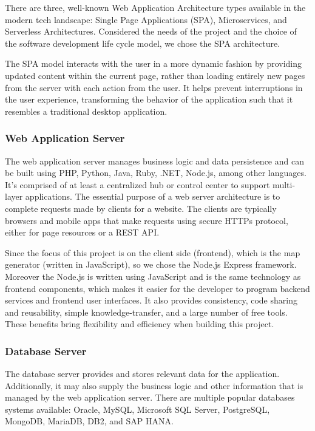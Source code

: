 There are three, well-known Web Application Architecture types available in the modern tech landscape: Single Page Applications (SPA), Microservices, and Serverless Architectures. Considered the needs of the project and the choice of the software development life cycle model, we chose the SPA architecture.

The SPA model interacts with the user in a more dynamic fashion by providing updated content within the current page, rather than loading entirely new pages from the server with each action from the user. It helps prevent interruptions in the user experience, transforming the behavior of the application such that it resembles a traditional desktop application.

\subsubsection{Web Application Server}
The web application server manages business logic and data persistence and can be built using PHP, Python, Java, Ruby, .NET, Node.js, among other languages. It’s comprised of at least a centralized hub or control center to support multi-layer applications. The essential purpose of a web server architecture is to complete requests made by clients for a website. The clients are typically browsers and mobile apps that make requests using secure HTTPs protocol, either for page resources or a REST API.

Since the focus of this project is on the client side (frontend), which is the map generator (written in JavaScript), so we chose the Node.js Express framework. Moreover the Node.js is written using JavaScript and is the same technology as frontend components, which makes it easier for the developer to program backend services and frontend user interfaces. It also provides consistency, code sharing and reusability, simple knowledge-transfer, and a large number of free tools. These benefits bring flexibility and efficiency when building this project.

\subsubsection{Database Server}
The database server provides and stores relevant data for the application. Additionally, it may also supply the business logic and other information that is managed by the web application server. There are multiple popular databases systems available: Oracle, MySQL, Microsoft SQL Server, PostgreSQL, MongoDB, MariaDB, DB2, and SAP HANA.

